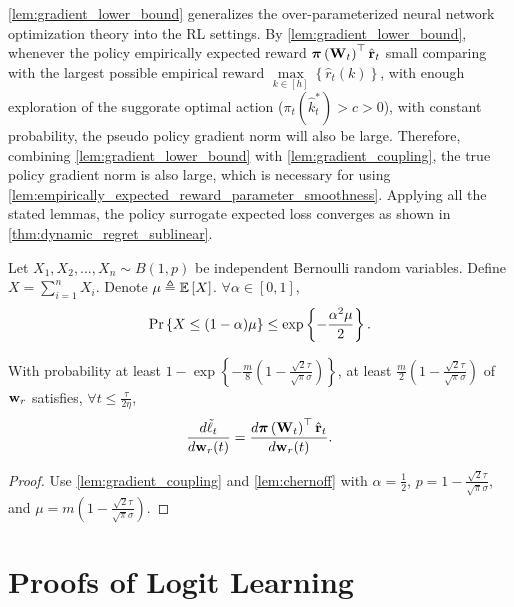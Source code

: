 \cref{lem:gradient_lower_bound} generalizes the over-parameterized neural network optimization theory into the RL settings. By \cref{lem:gradient_lower_bound}, whenever the policy empirically expected reward ${\boldsymbol{\pi}}\left( {\mathbf{W}}_t \right)^\top \hat{{\mathbf{r}}}_t$ small comparing with the largest possible empirical reward $\max\limits_{k \in \left[h\right]}\left\{ \hat{r}_{t}(k) \right\}$, with enough exploration of the suggorate optimal action ($\pi_{t}(\hat{k}_t^*) > c > 0$), with constant probability, the pseudo policy gradient norm will also be large. Therefore, combining \cref{lem:gradient_lower_bound} with \cref{lem:gradient_coupling}, the true policy gradient norm is also large, which is necessary for using \cref{lem:empirically_expected_reward_parameter_smoothness}. Applying all the stated lemmas, the policy surrogate expected loss converges as shown in \cref{thm:dynamic_regret_sublinear}.

\begin{lem}[Chernoff]
\label{lem:chernoff}
    Let $X_1, X_2, \dots, X_n \sim B(1, p)$ be independent Bernoulli random variables. Define $X = \sum\limits_{i=1}^{n}{ X_i  }$. Denote $\mu \triangleq {\mathbb{E}}\left[ X \right]$. $\forall \alpha \in [0,1]$,
\begin{equation*}
    {\text{Pr}}\left\{ X \le (1 - \alpha) \mu \right\} \le \exp\left\{ - \frac{\alpha^2 \mu}{2} \right\}.
\end{equation*}
\end{lem}

\begin{lem}
\label{lem:gradient_coupling_in_total}
With probability at least $1 - \exp\left\{ - \frac{m}{8} \left( 1 - \frac{\sqrt{2}\tau}{\sqrt{\pi}\sigma} \right) \right\}$, at least $\frac{m}{2}\left( 1 - \frac{\sqrt{2}\tau}{\sqrt{\pi}\sigma} \right) $ of ${\mathbf{w}}_r$ satisfies, $\forall t \le \frac{\tau}{ 2 \eta }$,
\begin{equation*}
	\frac{d\tilde{\ell}_t}{d {\mathbf{w}}_r(t)} = \frac{d {\boldsymbol{\pi}}\left({\mathbf{W}}_t\right)^\top \hat{{\mathbf{r}}}_t}{d {\mathbf{w}}_r(t)}.
\end{equation*}
\end{lem}
\begin{proof}
Use \cref{lem:gradient_coupling} and \cref{lem:chernoff} with $\alpha = \frac{1}{2}$, $p = 1 - \frac{\sqrt{2}\tau}{\sqrt{\pi}\sigma}$, and $\mu = m \left( 1 - \frac{\sqrt{2}\tau}{\sqrt{\pi}\sigma} \right)$.
\end{proof}

\section{Proofs of Logit Learning}

